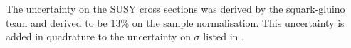 The uncertainty on the SUSY cross sections was derived by the squark-gluino team
and derived to be 13\% on the sample normalisation. This uncertainty is added in
quadrature to the uncertainty on $\sigma$ listed in .
